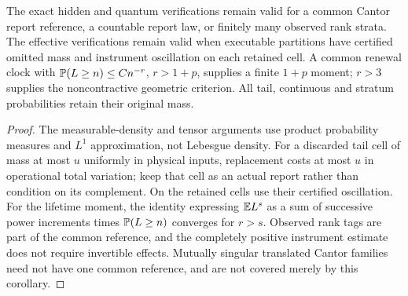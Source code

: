 \begin{corollary}\label{cor:singular}
The exact hidden and quantum verifications remain valid for a common Cantor report reference, a countable report law, or finitely many observed rank strata. The effective verifications remain valid when executable partitions have certified omitted mass and instrument oscillation on each retained cell. A common renewal clock with $\mathbb P(L\ge n)\le C n^{-r}$, $r>1+p$, supplies a finite $1+p$ moment; $r>3$ supplies the noncontractive geometric criterion. All tail, continuous and stratum probabilities retain their original mass.
\end{corollary}
\begin{proof}
The measurable-density and tensor arguments use product probability measures and $L^1$ approximation, not Lebesgue density. For a discarded tail cell of mass at most $u$ uniformly in physical inputs, replacement costs at most $u$ in operational total variation; keep that cell as an actual report rather than condition on its complement. On the retained cells use their certified oscillation. For the lifetime moment, the identity expressing $\mathbb E L^s$ as a sum of successive power increments times $\mathbb P(L\ge n)$ converges for $r>s$. Observed rank tags are part of the common reference, and the completely positive instrument estimate does not require invertible effects. Mutually singular translated Cantor families need not have one common reference, and are not covered merely by this corollary.
\end{proof}

